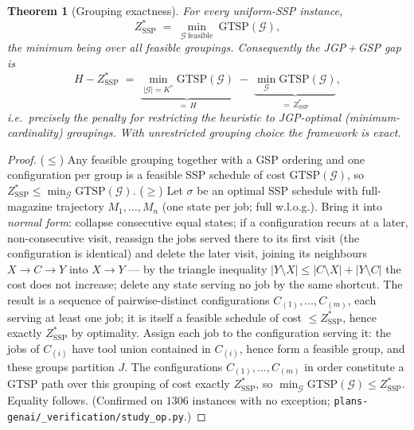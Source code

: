 \documentclass[11pt,a4paper]{article}
\theoremstyle{plain}
\newtheorem{theorem}{Theorem}[section]
\theoremstyle{definition}
\newcommand{\Kstar}{K^{*}}
\newcommand{\ZSSP}{Z_{\mathrm{SSP}}^{*}}
\begin{document}
\begin{thmbox}
\begin{theorem}[Grouping exactness]
\label{thm:grouping_exact}
For every uniform-SSP instance,
\[
  \ZSSP \;=\; \min_{\mathcal{G}\ \mathrm{feasible}}\ \mathrm{GTSP}(\mathcal{G}),
\]
the minimum being over \emph{all} feasible groupings. Consequently the JGP\,+\,GSP gap is
\[
  H-\ZSSP \;=\;
  \underbrace{\min_{|\mathcal{G}|=\Kstar}\mathrm{GTSP}(\mathcal{G})}_{=\,H}
  \;-\;
  \underbrace{\min_{\mathcal{G}}\mathrm{GTSP}(\mathcal{G})}_{=\,\ZSSP},
\]
i.e.\ precisely the penalty for restricting the heuristic to JGP-\emph{optimal}
(minimum-cardinality) groupings. With unrestricted grouping choice the framework is exact.
\end{theorem}
\end{thmbox}

\begin{proofbox}
\begin{proof}
($\le$) Any feasible grouping together with a GSP ordering and one configuration per group
is a feasible SSP schedule of cost $\mathrm{GTSP}(\mathcal{G})$, so
$\ZSSP\le\min_{\mathcal{G}}\mathrm{GTSP}(\mathcal{G})$.
($\ge$)
Let $\sigma$ be an optimal SSP schedule with full-magazine trajectory $M_1,\dots,M_n$
(one state per job; full w.l.o.g.). Bring it into \emph{normal form}: collapse consecutive
equal states; if a configuration recurs at a later, non-consecutive visit, reassign the
jobs served there to its first visit (the configuration is identical) and delete the later
visit, joining its neighbours $X\to C\to Y$ into $X\to Y$ --- by the triangle inequality
$|Y\setminus X|\le|C\setminus X|+|Y\setminus C|$ the cost does not increase; delete any
state serving no job by the same shortcut. The result is a sequence of pairwise-distinct
configurations $C_{(1)},\dots,C_{(m)}$, each serving at least one job; it is itself a
feasible schedule of cost $\le\ZSSP$, hence exactly $\ZSSP$ by optimality. Assign each job
to the configuration serving it: the jobs of $C_{(i)}$ have tool union contained in
$C_{(i)}$, hence form a feasible group, and these groups partition $J$. The configurations
$C_{(1)},\dots,C_{(m)}$ in order constitute a GTSP path over this grouping of cost exactly
$\ZSSP$, so $\min_{\mathcal{G}}\mathrm{GTSP}(\mathcal{G})\le\ZSSP$. Equality follows.
(Confirmed on $1306$ instances with no exception;
\texttt{plans-genai/\_verification/study\_op.py}.)
\end{proof}
\end{proofbox}
\end{document}
